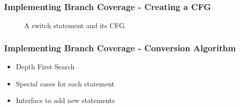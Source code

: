 \begin{frame}
\frametitle{Implementing Branch Coverage - Creating a CFG}

\begin{figure}
\centering
\begin{minipage}{.44\textwidth}
  \centering
  
\end{minipage}%
\begin{minipage}{.55\textwidth}
  \centering
\end{minipage}
\caption{A switch statement and its CFG.}
\label{fig:switch2}
\end{figure}

\end{frame}

\begin{frame}
\frametitle{Implementing Branch Coverage - Conversion Algorithm}

\begin{itemize}
\item Depth First Search
\item Special cases for each statement
\item Interface to add new statements
\end{itemize}
\end{frame}